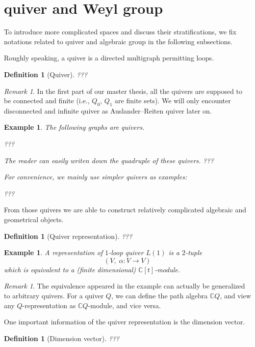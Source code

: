 \documentclass[reqno,11pt]{book}
\numberwithin{equation}{section}
\theoremstyle{plain}
\newtheorem{defn}[theorem]{Definition}
\newtheorem{eg}[theorem]{Example}
\theoremstyle{plain}
\numberwithin{equation}{section}
\theoremstyle{remark}
\newtheorem{remark}[theorem]{Remark}
\begin{document}
\section{quiver and Weyl group}
To introduce more complicated spaces and discuss their stratifications, we fix notations related to quiver and algebraic group in the following subsections.

Roughly speaking, a quiver is a directed multigraph permitting loops.

\begin{defn}[Quiver]
???
\end{defn}

\begin{remark}
In the first part of our master thesis, all the quivers are supposed to be connected and finite (i.e., $Q_0$, $Q_1$ are finite sets). We will only encounter disconnected and infinite quiver as Auslander--Reiten quiver later on.
\end{remark}

\begin{eg}
The following graphs are quivers.

???

The reader can easily writen down the quadruple of these quivers. ???

For convenience, we mainly use simpler quivers as examples:

???

\end{eg}

From those quivers we are able to construct relatively complicated algebraic and geometrical objects.

\begin{defn}[Quiver representation]
???
\end{defn}
\begin{eg}
A representation of $1$-loop quiver $L(1)$ is a $2$-tuple
$$(V, \; \alpha: V \longrightarrow V)$$
which is equivalent to a (finite dimensional) $\mathbb{C}[t]$-module.
\end{eg}
\begin{remark}
The equivalence appeared in the example can actually be generalized to arbitrary quivers. For a quiver $Q$, we can define the path algebra $\mathbb{C}Q$, and view any $Q$-representation as $\mathbb{C}Q$-module, and vice versa.
\end{remark}

One important information of the quiver representation is the dimension vector.
\begin{defn}[Dimension vector]
???
\end{defn} 
\end{document}
